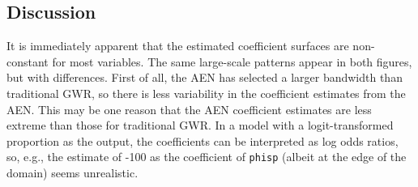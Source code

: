 \documentclass[authoryear, review, 11pt]{elsarticle}
\begin{document}

			
	\subsection{Discussion}
	It is immediately apparent that the estimated coefficient surfaces are non-constant for most variables. The same large-scale patterns appear in both figures, but with differences. First of all, the AEN has selected a larger bandwidth than traditional GWR, so there is less variability in the coefficient estimates from the AEN. This may be one reason that the AEN coefficient estimates are less extreme than those for traditional GWR. In a model with a logit-transformed proportion as the output, the coefficients can be interpreted as log odds ratios, so, e.g., the estimate of -100 as the coefficient of \verb!phisp! (albeit at the edge of the domain) seems unrealistic.
	
\end{document}
